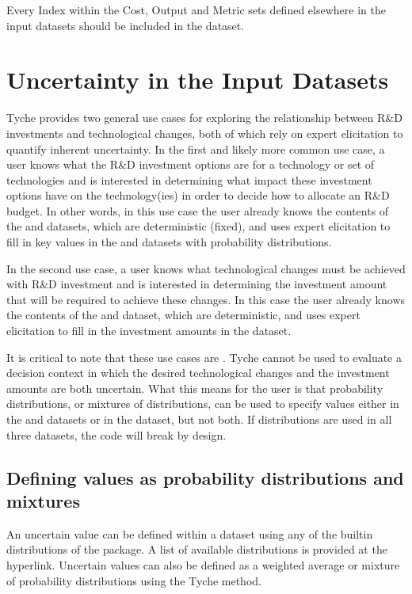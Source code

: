 \documentclass[letterpaper,10pt,english]{sphinxmanual}
\begin{document}
\sphinxAtStartPar
{} Every Index within the Cost, Output and Metric sets defined elsewhere in the input datasets should be included in the  dataset.


\section{Uncertainty in the Input Datasets}
\label{\detokenize{cheat-sheet:uncertainty-in-the-input-datasets}}
\sphinxAtStartPar
Tyche provides two general use cases for exploring the relationship between R\&D investments and technological changes, both of which rely on expert elicitation to quantify inherent uncertainty. In the first and likely more common use case, a user knows what the R\&D investment options are for a technology or set of technologies and is interested in determining what impact these investment options have on the technology(ies) in order to decide how to allocate an R\&D budget. In other words, in this use case the user already knows the contents of the  and  datasets, which are deterministic (fixed), and uses expert elicitation to fill in key values in the  and  datasets with probability distributions.

\sphinxAtStartPar
In the second use case, a user knows what technological changes must be achieved with R\&D investment and is interested in determining the investment amount that will be required to achieve these changes. In this case the user already knows the contents of the  and  dataset, which are deterministic, and uses expert elicitation to fill in the investment amounts in the  dataset.

\sphinxAtStartPar
It is critical to note that these use cases are . Tyche cannot be used to evaluate a decision context in which the desired technological changes and the investment amounts are both uncertain. What this means for the user is that probability distributions, or mixtures of distributions, can be used to specify values either in the  and  datasets or in the  dataset, but not both. If distributions are used in all three datasets, the code will break by design.


\subsection{Defining values as probability distributions and mixtures}
\label{\detokenize{cheat-sheet:defining-values-as-probability-distributions-and-mixtures}}
\sphinxAtStartPar
An uncertain value can be defined within a dataset using any of the built\sphinxhyphen{}in distributions of the  package. A list of available distributions is provided at the hyperlink. Uncertain values can also be defined as a weighted average or mixture of probability distributions using the Tyche  method.
\end{document}
